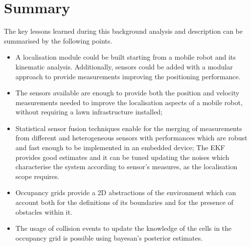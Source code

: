 

\section{Summary}

\noindent The key lessons learned during this background analysis and description can be summarised by the following points.
\begin{itemize}
    \item A localisation module could be built starting from a mobile robot and its kinematic analysis. Additionally, sensors could be added with a modular approach to provide measurements improving the positioning performance.%
    \item The sensors available are enough to provide both the position and velocity measurements needed to improve the localisation aspects of a mobile robot, without requiring a lawn infrastructure installed;
    \item Statistical sensor fusion techniques enable for the merging of measurements from different and heterogeneous sensors with performances which are robust and fast enough to be implemented in an embedded device;
    The \gls{EKF} provides good estimates and it can be tuned updating the noises which characterise the system according to sensor's measures, as the localisation scope requires.
    \item Occupancy grids provide a \gls{2D} abstractions of the environment which can account both for the definitions of its boundaries and for the presence of obstacles within it.
    \item The usage of collision events to update the knowledge of the cells in the occupancy grid is possible using bayesan's posterior estimates.
\end{itemize}



\cleardoublepage
